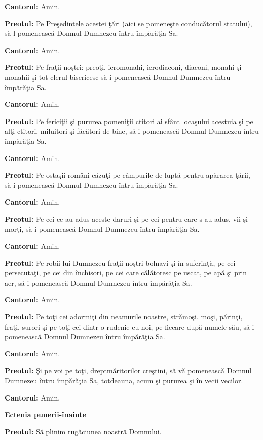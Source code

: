 \documentclass[11pt,letterpaper]{book} \usepackage{ucs}
\newcommand{\mysection}[1]{\begin{center}{\Large \bf #1}\end{center}}
\begin{document}
  {\bf Cantorul:} Amin.

  {\bf Preotul:} Pe Preşedintele acestei ţări (aici se pomeneşte conducătorul
  statului), să-l pomenească Domnul Dumnezeu întru împărăţia Sa.

  {\bf Cantorul:} Amin.

  {\bf Preotul:} Pe fraţii noştri: preoţi, ieromonahi, ierodiaconi,
  diaconi, monahi şi monahii şi tot clerul bisericesc să-i pomenească
  Domnul Dumnezeu întru împărăţia Sa.
    
  {\bf Cantorul:} Amin.

  {\bf Preotul:} Pe fericiţii şi pururea pomeniţii ctitori ai sfânt
  locaşului acestuia şi pe alţi ctitori, miluitori şi făcători de
  bine, să-i pomenească Domnul Dumnezeu întru împărăţia Sa.

  {\bf Cantorul:} Amin.

  {\bf Preotul:} Pe ostaşii români căzuţi pe câmpurile de luptă pentru
  apărarea ţării, să-i pomenească Domnul Dumnezeu întru împărăţia Sa.

  {\bf Cantorul:} Amin.

  {\bf Preotul:} Pe cei ce au adus aceste daruri şi pe cei pentru care
  s-au adus, vii şi morţi, să-i pomenească Domnul Dumnezeu întru
  împărăţia Sa.

  {\bf Cantorul:} Amin.

  {\bf Preotul:} Pe robii lui Dumnezeu fraţii noştri bolnavi şi în
  suferinţă, pe cei persecutaţi, pe cei din închisori, pe cei care
  călătoresc pe uscat, pe apă şi prin aer, să-i pomenească Domnul
  Dumnezeu întru împărăţia Sa.

  {\bf Cantorul:} Amin.

  {\bf Preotul:} Pe toţi cei adormiţi din neamurile noastre, strămoşi,
  moşi, părinţi, fraţi, surori şi pe toţi cei dintr-o rudenie cu noi,
  pe fiecare după numele său, să-i pomenească Domnul Dumnezeu întru
  împărăţia Sa.
   
  {\bf Cantorul:} Amin.

  {\bf Preotul:} Şi pe voi pe toţi, dreptmăritorilor creştini, să vă
  pomenească Domnul Dumnezeu întru împărăţia Sa, totdeauna, acum şi
  pururea şi în vecii vecilor.

  {\bf Cantorul:} Amin.


  \mysection{Ectenia punerii-înainte}

  {\bf Preotul:} Să plinim rugăciunea noastră Domnului.
\end{document}
